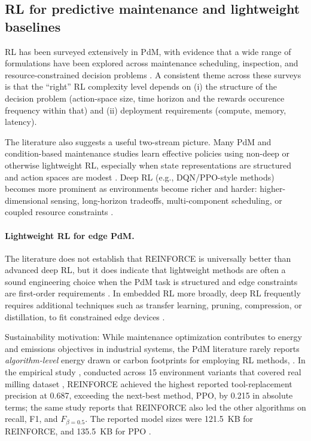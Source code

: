 \documentclass[sn-basic]{sn-jnl} %
\begin{document}
\subsection{RL for predictive maintenance and lightweight baselines}
RL has been surveyed extensively in PdM, with evidence that a wide range of formulations have been explored across maintenance scheduling, inspection, and resource-constrained decision problems \cite{Siraskar2023, Ogunfowora2023, Zhang2024}. A consistent theme across these surveys is that the ``right'' RL complexity level depends on (i) the structure of the decision problem (action-space size, time horizon and the rewards occurence frequency within that) and (ii) deployment requirements (compute, memory, latency).

The literature also suggests a useful two-stream picture. Many PdM and condition-based maintenance studies learn effective policies using non-deep or otherwise lightweight RL, especially when state representations are structured and action spaces are modest \cite{Adsule2020, Yousefi2020, Rasay2024, Dadash2024}. Deep RL (e.g., DQN/PPO-style methods) becomes more prominent as environments become richer and harder: higher-dimensional sensing, long-horizon tradeoffs, multi-component scheduling, or coupled resource constraints \cite{Liu2020, Chen2023, Lee2022, Ong2022-02}.

\paragraph{Lightweight RL for edge PdM.}
The literature does not establish that REINFORCE is universally better than advanced deep RL, but it does indicate that lightweight methods are often a sound engineering choice when the PdM task is structured and edge constraints are first-order requirements \cite{Compare2020, Njor2024, Pandey2023}. In embedded RL more broadly, deep RL frequently requires additional techniques such as transfer learning, pruning, compression, or distillation, to fit constrained edge devices \cite{Jang2020, Szydlo2022, Xu2022}.

Sustainability motivation: While maintenance optimization contributes to energy and emissions objectives in industrial systems, the PdM literature rarely reports \emph{algorithm-level} energy drawn or carbon footprints for employing RL methods, \cite{Banyai2021, Banyai2022, JasiulewiczKaczmarek2024}. In the empirical study \cite{Siraskar2025}, conducted across 15 environment variants that covered real milling dataset \cite{PHMdata2010}, REINFORCE achieved the highest reported tool-replacement precision at 0.687, exceeding the next-best method, PPO, by 0.215 in absolute terms; the same study reports that REINFORCE also led the other algorithms on recall, F1, and $F_{\beta=0.5}$. The reported model sizes were 121.5~KB for REINFORCE, and 135.5~KB for PPO \cite{Siraskar2025}.
\end{document}
